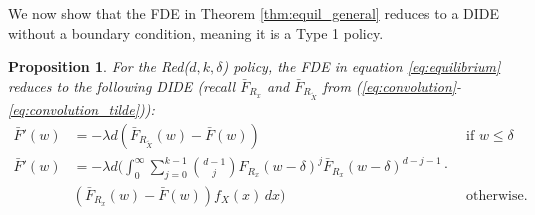 \documentclass[12pt]{report}
\newtheorem{proposition}[theorem]{Proposition}
\begin{document}
We now show that the FDE in Theorem \ref{thm:equil_general} reduces to a DIDE without a boundary condition, meaning it is a Type 1 policy.
\begin{proposition} \label{prop:Reddk}
For the Red($d,k,\delta$) policy, the FDE in equation \eqref{eq:equilibrium} reduces to the following DIDE (recall $\bar F_{R_x}$ and $\bar F_{R_{\tilde X}}$ from (\ref{eq:convolution}-\ref{eq:convolution_tilde})):
\begin{align}
\bar F'(w)
&=
-\lambda d (\bar F_{R_{\tilde X}}(w) - \bar F(w)) & \mbox{ if } w \leq \delta \label{eq:reddk_lowerdelta}\\
\bar F'(w)
&=
-\lambda d \bigg( \int_0^\infty \sum_{j=0}^{k-1} \binom{d-1}{j} F_{R_x}(w-\delta)^j \bar F_{R_x}(w-\delta)^{d-j-1} \cdot \nonumber \\
& \left( \bar F_{R_x}(w) - \bar F(w) \right) f_X(x) \, dx \bigg) & \mbox{ otherwise.} \label{eq:reddk_higherdelta}
\end{align}
\end{proposition}
\end{document}

